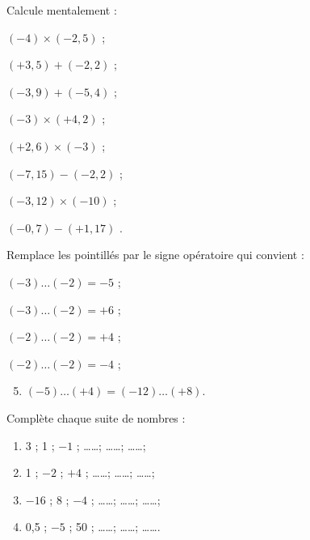 \begin{exercice}
Calcule mentalement :
\begin{colenumerate}{2}
 \item $(-4) \times (-2,5)$  \dotfill;
 \item $(+3,5) + (-2,2)$  \dotfill;
 \item $(-3,9) + (-5,4)$  \dotfill;
 \item $(-3) \times (+4,2)$  \dotfill;
 \item $(+2,6) \times (-3)$  \dotfill;
 \item $(-7,15) - (-2,2)$  \dotfill;
 \item $(-3,12) \times (-10)$  \dotfill;
 \item $(-0,7) - (+1,17)$ \dotfill.
 \end{colenumerate}
\end{exercice}


\begin{exercice}
Remplace les pointillés par le signe opératoire qui convient :
\begin{colenumerate}{2}
 \item $(-3) \ldots (-2) = -5$ ;
 \item $(-3) \ldots (-2) = +6$ ;
 \item $(-2) \ldots (-2) = +4$ ;
 \item $(-2) \ldots (-2) = -4$ ;
 \end{colenumerate}
\begin{enumerate}
\setcounter{enumi}{4}
\vspace{-1.5em}
\item $(-5) \ldots (+4) = (-12) \ldots (+8)$.
\end{enumerate}
 \end{exercice}

 
\columnbreak

\begin{exercice}[Logique !]
Complète chaque suite de nombres :
\begin{enumerate}
 \item 3 ; 1 ; $-1$ ; \ldots  \ldots; \ldots  \ldots; \ldots  \ldots;
 \item 1 ; $-2$ ; $+4$ ; \ldots  \ldots; \ldots  \ldots; \ldots  \ldots;
 \item $-16$ ; 8 ; $-4$ ; \ldots  \ldots; \ldots  \ldots; \ldots \ldots ;
 \item 0,5 ; $- 5$ ; 50 ; \ldots  \ldots; \ldots  \ldots; \ldots \ldots .
 \end{enumerate}
\end{exercice}


